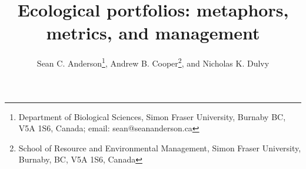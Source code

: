 \documentclass[11pt]{article}
\title{Ecological portfolios: metaphors,\\metrics, and management}
\author{Sean C. Anderson\thanks{Department of Biological Sciences, Simon Fraser
    University, Burnaby BC, V5A 1S6, Canada; email: sean@seananderson.ca},
  Andrew B. Cooper\thanks{School of Resource and Environmental Management,
    Simon Fraser University, Burnaby, BC, V5A 1S6, Canada},
  and Nicholas K. Dulvy\footnotemark[1]}
\date{}
\begin{document}
\maketitle

\linenumbers
\modulolinenumbers[5]
\begin{spacing}{1.1}



\clearpage

\clearpage

\clearpage

\clearpage


\end{spacing}
\end{document}

